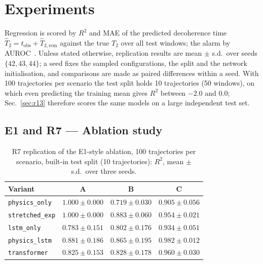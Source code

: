 \documentclass[twocolumn,10pt]{article}
\begin{document}
\section{Experiments}

Regression is scored by $R^2$ and MAE of the predicted decoherence time
$\widehat T_2 = t_\mathrm{obs} + \widehat T_{2,\text{rem}}$ against the
true $T_2$ over all test windows; the alarm by AUROC~\cite{Fawcett2006}.
Unless stated otherwise, replication results are mean $\pm$ s.d.\ over seeds $\{42,43,44\}$; a seed fixes the sampled configurations, the split and the
network initialisation, and comparisons are made as paired differences
within a seed.
With 100 trajectories per scenario the test split holds 10 trajectories
(50 windows), on which even predicting the training mean gives $R^2$
between $-2.0$ and $0.0$; Sec.~\ref{sec:r13} therefore scores the same
models on a large independent test set.

\subsection{E1 and R7 --- Ablation study}
\label{sec:e1}
\label{sec:r7}

\begin{table}[h]
\centering
\caption{R7 replication of the E1-style ablation, 100 trajectories per scenario, built-in test split
  (10 trajectories): $R^2$, mean $\pm$ s.d.\ over three
  seeds.\label{tab:e1}\label{tab:r7}}
\footnotesize
\setlength{\tabcolsep}{4pt}
\begin{tabular}{lccc}
\toprule
Variant & A & B & C \\
\midrule
\texttt{physics\_only}  & $1.000 \pm 0.000$ & $0.719 \pm 0.030$ & $0.905 \pm 0.056$ \\
\texttt{stretched\_exp} & $1.000 \pm 0.000$ & $0.883 \pm 0.060$ & $0.954 \pm 0.021$ \\
\texttt{lstm\_only}     & $0.783 \pm 0.151$ & $0.802 \pm 0.176$ & $0.934 \pm 0.051$ \\
\texttt{physics\_lstm}  & $0.881 \pm 0.186$ & $0.865 \pm 0.195$ & $0.982 \pm 0.012$ \\
\texttt{transformer}    & $0.825 \pm 0.153$ & $0.828 \pm 0.178$ & $0.960 \pm 0.030$ \\
\bottomrule
\end{tabular}
\end{table}
\end{document}
